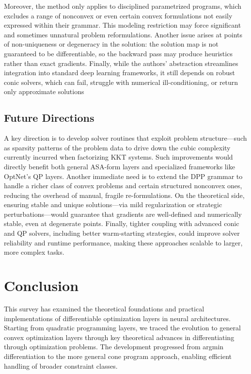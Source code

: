 \documentclass{article}
\begin{document}
Moreover, the method only applies to disciplined parametrized programs, which excludes a range of nonconvex or even certain convex formulations not easily expressed within their grammar. This modeling restriction may force significant and sometimes unnatural problem reformulations. Another issue arises at points of non-uniqueness or degeneracy in the solution: the solution map is not guaranteed to be differentiable, so the backward pass may produce heuristics rather than exact gradients. Finally, while the authors’ abstraction streamlines integration into standard deep learning frameworks, it still depends on robust conic solvers, which can fail, struggle with numerical ill-conditioning, or return only approximate solutions

\subsection{Future Directions}

A key direction is to develop solver routines that exploit problem structure—such as sparsity patterns of the problem data to drive down the cubic complexity currently incurred when factorizing KKT systems. Such improvements would directly benefit both general ASA-form layers and specialized frameworks like OptNet’s QP layers. Another immediate need is to extend the DPP grammar to handle a richer class of convex problems and certain structured nonconvex ones, reducing the overhead of manual, fragile re-formulations. On the theoretical side, ensuring stable and unique solutions—via mild regularization or strategic perturbations—would guarantee that gradients are well-defined and numerically stable, even at degenerate points. Finally, tighter coupling with advanced conic and QP solvers, including better warm-starting strategies, could improve solver reliability and runtime performance, making these approaches scalable to larger, more complex tasks.


\section{Conclusion}

This survey has examined the theoretical foundations and practical implementations of differentiable optimization layers in neural architectures. Starting from quadratic programming layers, we traced the evolution to general convex optimization layers through key theoretical advances in differentiating through optimization problems. The development progressed from argmin differentiation to the more general cone program approach, enabling efficient handling of broader constraint classes.
\end{document}
